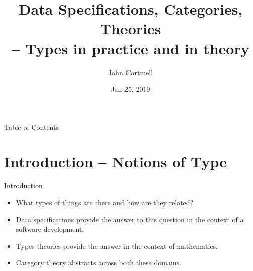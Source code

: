 \documentclass{beamer}
\title[Types in practice and in theory]{Data Specifications, Categories, Theories\\ -- Types in practice and in theory}
\author{John Cartmell}
\institute{Otium}
\date{Jan 25, 2019}
\begin{document}
\begin{frame}
\titlepage
\end{frame}

\begin{frame}{Table of Contents}
\tableofcontents
\end{frame}

\section{Introduction -- Notions of Type}
\begin{frame}{Introduction}
\begin{itemize}
\item
What types of things are there and how are they related? 
\pause \item Data specifications provide the answer to this question in the context of a software development. 
\pause \item Types theories provide the answer in the context of mathematics. 
\pause \item Category theory abstracts across both these domains.
\end{itemize}
\end{frame}
\end{document}
